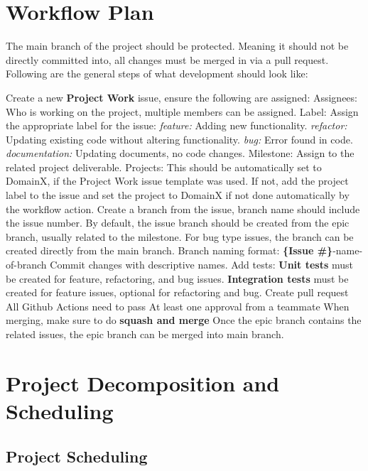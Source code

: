 \documentclass{article}
\begin{document}
\section{Workflow Plan}
The main branch of the project should be protected. Meaning it should not be directly committed into, all changes must be merged in via a pull request.
Following are the general steps of what development should look like:
\begin{outline}[itemize]
 \1 Create a new \textbf{Project Work} issue, ensure the following are assigned:
  \2 Assignees: Who is working on the project, multiple members can be assigned.
  \2 Label: Assign the appropriate label for the issue:
    \3 \textit{feature:} Adding new functionality.
    \3 \textit{refactor:} Updating existing code without altering functionality.
    \3 \textit{bug:} Error found in code.
    \3 \textit{documentation:} Updating documents, no code changes.
  \2 Milestone: Assign to the related project deliverable.
  \2 Projects: This should be automatically set to DomainX, if the Project Work issue template was used.
    \3 If not, add the project label to the issue and set the project to DomainX if not done automatically by the workflow action.
\1 Create a branch from the issue, branch name should include the issue number. 
  \2 By default, the issue branch should be created from the epic branch, usually related to the milestone.
  \2 For bug type issues, the branch can be created directly from the main branch.
  \2 Branch naming format: \textbf{\{Issue \#\}}-name-of-branch
\1 Commit changes with descriptive names.
\1 Add tests:
  \2 \textbf{Unit tests} must be created for feature, refactoring, and bug issues.
  \2 \textbf{Integration tests} must be created for feature issues, optional for refactoring and bug.
\1 Create pull request
  \2 All Github Actions need to pass
  \2 At least one approval from a teammate
  \2 When merging, make sure to do \textbf{squash and merge}
\1 Once the epic branch contains the related issues, the epic branch can be merged into main branch.
\end{outline}

\section{Project Decomposition and Scheduling}

\subsection*{Project Scheduling}
\end{document}

